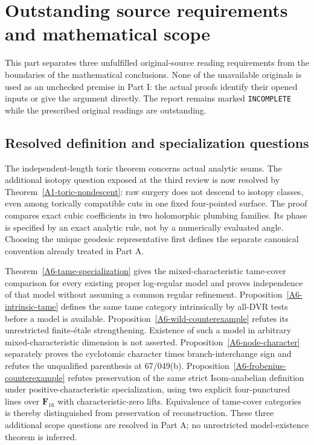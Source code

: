 \section{Outstanding source requirements and mathematical scope}
This part separates three unfulfilled original-source reading requirements
from the boundaries of the mathematical conclusions. None of the
unavailable originals is used as an unchecked premise in Part I:
the actual proofs identify their opened inputs or give the argument
directly. The report remains marked \texttt{INCOMPLETE} while the
prescribed original readings are outstanding.

\subsection{Resolved definition and specialization questions}
The independent-length toric theorem concerns actual analytic seams.
The additional isotopy question exposed at the third review is now
resolved by Theorem~\ref{A1-toric-nondescent}: raw surgery does not
descend to isotopy classes, even among torically compatible cuts in
one fixed four-pointed surface. The proof compares exact cubic
coefficients in two holomorphic plumbing families. Its phase is
specified by an exact analytic rule, not by a numerically evaluated
angle. Choosing the unique geodesic representative first defines the
separate canonical convention already treated in Part A.

Theorem~\ref{A6-tame-specialization} gives the mixed-characteristic
tame-cover comparison for every existing proper log-regular model
and proves independence of that model without assuming a common
regular refinement. Proposition~\ref{A6-intrinsic-tame} defines the
same tame category intrinsically by all-DVR tests before a model is
available. Proposition~\ref{A6-wild-counterexample} refutes
its unrestricted finite-\'etale strengthening. Existence of such a
model in arbitrary mixed-characteristic dimension is not asserted.
Proposition~\ref{A6-node-character} separately proves the cyclotomic
character times branch-interchange sign and refutes the unqualified
parenthesis at 67/049(b). Proposition~\ref{A6-frobenius-counterexample}
refutes preservation of the same strict Isom-anabelian definition
under positive-characteristic specialization, using two explicit
four-punctured lines over $\mathbf F_{16}$ with characteristic-zero
lifts. Equivalence of tame-cover categories is thereby distinguished
from preservation of reconstruction. These three additional scope
questions are resolved in Part A; no unrestricted model-existence
theorem is inferred.

